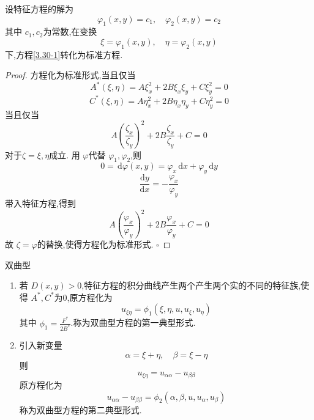\documentclass[../../PDE.tex]{subfiles}
\begin{document}
\begin{proposition}
    设特征方程的解为 \[
     \varphi _1 \left( x,y \right)= c_1,\quad  \varphi _2 \left( x,y \right)= c_2  
    \]其中 \(  c_1,c_2  \)为常数,在变换 \[
     \xi =  \varphi  _1 \left( x,y \right),\quad \eta =  \varphi _2 \left( x,y \right)  
    \]下,方程\ref{3.30-1}转化为标准方程. 
\end{proposition}
\begin{proof}
     方程化为标准形式,当且仅当 \[
     A^{*}\left(  \xi ,\eta  \right)= A \xi _{x}^{2}+ 2B \xi _{x} \xi _{y}+ C \xi _{y}^{2}= 0 
     \] \[
     C^{*}\left(  \xi ,\eta  \right)= A\eta _{x}^{2}+ 2B \eta _{x}\eta _{y}+ C\eta _{y}^{2}= 0
     \]
     当且仅当 \[
     A\left( \frac{\zeta _{x} }{\zeta _{y} }  \right)^{2}+ 2B \frac{\zeta _{x} }{\zeta _{y} }+ C= 0  
     \]对于\(  \zeta =  \xi ,\eta   \)成立. 用 \(   \varphi   \)代替 \(   \varphi _1 , \varphi _2   \),则   \[
    0=  \,\mathrm{d}  \varphi \left( x,y \right)=   \varphi _{x}\,\mathrm{d} x+  \varphi _{y}\,\mathrm{d} y
     \]   \[
     \frac{\mathrm{d}y}{\mathrm{d}x}=  -\frac{ \varphi _{x} }{ \varphi _{y} } 
     \]带入特征方程,得到 \[
     A\left( \frac{ \varphi _{x} }{ \varphi _{y} }  \right)^{2}+ 2B \frac{ \varphi _{x} }{ \varphi _{y} }+ C= 0  
     \]故  \(  \zeta =  \varphi   \)的替换,使得方程化为标准形式. 
    \hfill $\square$
\end{proof}

\begin{proposition}{双曲型}
    \begin{enumerate}
        \item 若 \(  D\left( x,y \right)> 0   \),特征方程的积分曲线产生两个产生两个实的不同的特征族,使得 \(  A^{*},C^{*}  \)为0,原方程化为 \[
            u_{ \xi \eta }= \phi _1 \left(  \xi ,\eta ,u,u_{ \xi },u_{\eta } \right) 
            \]其中 \(  \phi _1 = \frac{F^{*} }{ 2B^{*}}   \).称为双曲型方程的第一典型形式.
        \item 引入新变量 \[
         \alpha =  \xi + \eta ,\quad \beta =  \xi -\eta 
        \]则 \[
        u_{ \xi \eta }= u_{ \alpha  \alpha }-u_{\beta \beta }
        \]原方程化为 \[
        u_{ \alpha  \alpha }-u_{\beta \beta }= \phi _2 \left(  \alpha ,\beta ,u,u_{ \alpha },u_{\beta } \right) 
        \]称为双曲型方程的第二典型形式.
    \end{enumerate}
       
\end{proposition}
\end{document}
